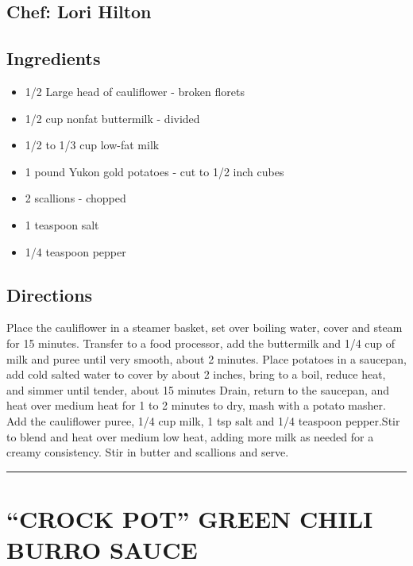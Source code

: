 \documentclass[
]{book}
\providecommand{\tightlist}{%
  \setlength{\itemsep}{0pt}\setlength{\parskip}{0pt}}
\begin{document}
\hypertarget{chef-lori-hilton-2}{%
\subsection*{Chef: Lori Hilton}\label{chef-lori-hilton-2}}


\hypertarget{ingredients-28}{%
\subsection*{Ingredients}\label{ingredients-28}}


\begin{itemize}
\tightlist
\item
  1/2 Large head of cauliflower - broken florets
\item
  1/2 cup nonfat buttermilk - divided
\item
  1/2 to 1/3 cup low-fat milk
\item
  1 pound Yukon gold potatoes - cut to 1/2 inch cubes
\item
  2 scallions - chopped
\item
  1 teaspoon salt
\item
  1/4 teaspoon pepper
\end{itemize}

\hypertarget{directions-28}{%
\subsection*{Directions}\label{directions-28}}


Place the cauliflower in a steamer basket, set over boiling water, cover and steam for 15 minutes. Transfer to a food processor, add the buttermilk and 1/4 cup of milk and puree until very smooth, about 2 minutes. Place potatoes in a saucepan, add cold salted water to cover by about 2 inches, bring to a boil, reduce heat, and simmer until tender, about 15 minutes Drain, return to the saucepan, and heat over medium heat for 1 to 2 minutes to dry, mash with a potato masher. Add the cauliflower puree, 1/4 cup milk, 1 tsp salt and 1/4 teaspoon pepper.Stir to blend and heat over medium low heat, adding more milk as needed for a creamy consistency. Stir in butter and scallions and serve.

\begin{center}\rule{0.5\linewidth}{0.5pt}\end{center}

\hypertarget{crock-pot-green-chili-burro-sauce}{%
\section*{``CROCK POT'' GREEN CHILI BURRO SAUCE}\label{crock-pot-green-chili-burro-sauce}}
\end{document}
